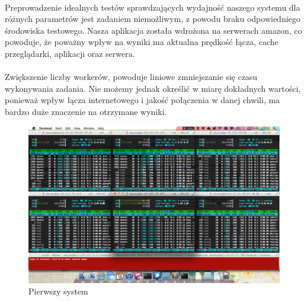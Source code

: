 \documentclass[wide,a4paper,titlepage,12pt]{article}
\begin{document}
\paragraph{}


\paragraph{}
Preprowadzenie idealnych testów sprawdzających wydajność naszego systemu dla różnych parametrów jest zadaniem niemożliwym, 
z powodu braku odpowiedniego środowiska testowego. Nasza aplikacja została wdrożona na serwerach amazon, co powoduje, 
że poważny wpływ na wyniki ma aktualna prędkość łącza, cache przeglądarki, aplikacji oraz serwera.

\paragraph{}
Zwiększenie liczby workerów, powoduje liniowe zmniejszanie się czasu wykonywania zadania. Nie możemy jednak określić w miarę
dokładnych wartości, ponieważ wpływ łącza internetowego i jakość połączenia w danej chwili, ma bardzo duże znaczenie na otrzymane wyniki.

\begin{figure}[h!]
\begin{center}
\includegraphics[scale=0.33]{amazon.png}
\end{center}
\caption{Pierwszy system}
\label{fig:amazon}
\end{figure}
\end{document}

